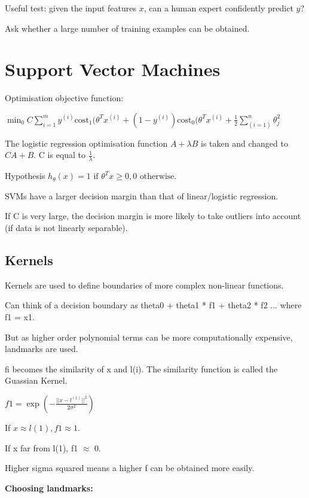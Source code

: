 \documentclass[12pt] {article}
\begin{document}
{    Useful test: given the input features $x$, can a human expert confidently 
    predict $y$?

    Ask whether a large number of training examples can be obtained. 

  \newpage

\section{Support Vector Machines}

  Optimisation objective function: 
  
  $\min_0 C \displaystyle\sum_{i=1}^m 
  y^{(i)}\text{cost}_1(\theta^Tx^{(i)} + (1-y^{(i)}) \text{cost}_0
  (\theta^Tx^{(i)} + \frac{1}{2} \displaystyle\sum_{(i=1)}^n \theta_j^2$

  The logistic regression optimisation function $A + \lambda B$ is taken and 
  changed to $CA+B$. C is equal to $\frac{1}{\lambda}$.

  Hypothesis $h_\theta(x) = 1 \text{ if } \theta^Tx \geq 0,
  0 \text{ otherwise.}$
    
  SVMs have a larger decision margin than that of linear/logistic regression.
  
  If C is very large, the decision margin is more likely to take outliers into
  account (if data is not linearly separable).
  
  \subsection{Kernels}
  
    Kernels are used to define boundaries of more complex non-linear functions.

    Can think of a decision boundary as theta0 + theta1 * f1 + theta2 * f2 ...
    where f1 = x1.
    
    But as higher order polynomial terms can be more computationally expensive,
    landmarks are used.
    
    fi becomes the similarity of x and l(i). The similarity function is called
    the Guassian Kernel.
    
    $f1 = \exp(- \frac{||x - l^{(1)}||^2}{2\sigma^2})$   

    If $x \approx l(1), f1 \approx 1$.

    If x far from l(1), f1 $\approx$ 0.

    Higher sigma squared means a higher f can be obtained more easily.

    \textbf{Choosing landmarks:}

}
\end{document}
